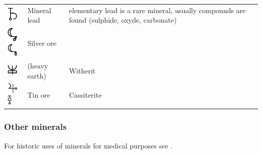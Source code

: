 \documentclass[british,final,landscape]{scrartcl}
\begin{document}
\begin{refsection}
\begin{supertabular}{p{0.3\textwidth}p{0.34\textwidth}p{0.34\textwidth}}
   \includegraphics[width=5mm]{Mineral/MineralLead} & Mineral lead & elementary lead is a rare mineral, usually compounds are found (sulphide, oxyde, carbonate) \\
   \includegraphics[width=5mm]{Mineral/SilverOre} \includegraphics[width=5mm]{Mineral/SilverOre2} & Silver ore & \\
   \includegraphics[width=5mm]{Mineral/TerraPonderosa} &  (heavy earth) & Witherit \\
   \includegraphics[width=5mm]{Mineral/TinOre} \includegraphics[height=5mm]{Mineral/TinOre2} & Tin ore & Cassiterite  \\
 \end{supertabular}

\subsubsection{Other minerals}

For historic uses of minerals for medical purposes see \parencite{Duf-13}.


\end{refsection}
\end{document}
